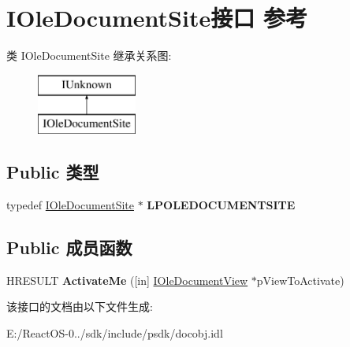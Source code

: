 \hypertarget{interface_i_ole_document_site}{}\section{I\+Ole\+Document\+Site接口 参考}
\label{interface_i_ole_document_site}
类 I\+Ole\+Document\+Site 继承关系图\+:\begin{figure}[H]
\begin{center}
\leavevmode
\includegraphics[height=2.000000cm]{interface_i_ole_document_site}
\end{center}
\end{figure}
\subsection*{Public 类型}
\begin{DoxyCompactItemize}
\item 
\mbox{\label{interface_i_ole_document_site_ada1956ba6c11eb542c357fe03f2ee2c6}} 
typedef \hyperlink{interface_i_ole_document_site}{I\+Ole\+Document\+Site} $\ast$ {\bfseries L\+P\+O\+L\+E\+D\+O\+C\+U\+M\+E\+N\+T\+S\+I\+TE}
\end{DoxyCompactItemize}
\subsection*{Public 成员函数}
\begin{DoxyCompactItemize}
\item 
\mbox{\label{interface_i_ole_document_site_a8f07e4d5f30fb0d9a8748047869d10d3}} 
H\+R\+E\+S\+U\+LT {\bfseries Activate\+Me} (\mbox{[}in\mbox{]} \hyperlink{interface_i_ole_document_view}{I\+Ole\+Document\+View} $\ast$p\+View\+To\+Activate)
\end{DoxyCompactItemize}


该接口的文档由以下文件生成\+:\begin{DoxyCompactItemize}
\item 
E\+:/\+React\+O\+S-\/0../sdk/include/psdk/docobj.\+idl\end{DoxyCompactItemize}
